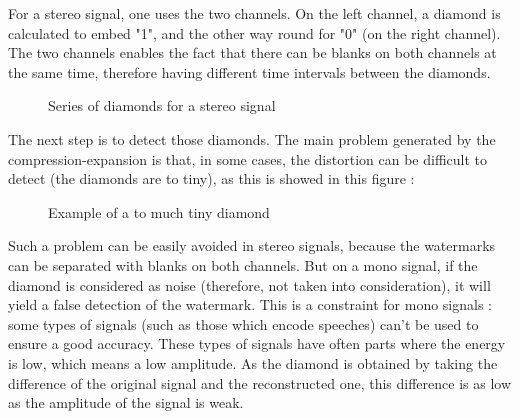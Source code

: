 For a stereo signal, one uses the two channels. On the left channel, a diamond is calculated to embed "1", and the other way round for "0" (on the right channel). The two channels enables the fact that there can be blanks on both channels at the same time, therefore having different time intervals between the diamonds.
\begin{figure}[H]
\caption{\label{stereo watermarking} Series of diamonds for a stereo signal}
\end{figure}

The next step is to detect those diamonds. The main problem generated by the compression-expansion is that, in some cases, the distortion can be difficult to detect (the diamonds are to tiny), as this is showed in this figure :
\begin{figure}[H]
\caption{\label{distortion} Example of a to much tiny diamond}
\end{figure}

Such a problem can be easily avoided in stereo signals, because the watermarks can be separated with blanks on both channels. But on a mono signal, if the diamond is considered as noise (therefore, not taken into consideration), it will yield a false detection of the watermark. This is a constraint for mono signals : some types of signals (such as those which encode speeches) can't be used to ensure a good accuracy. These types of signals have often parts where the energy is low, which means a low amplitude. As the diamond is obtained by taking the difference of the original signal and the reconstructed one, this difference is as low as the amplitude of the signal is weak.

